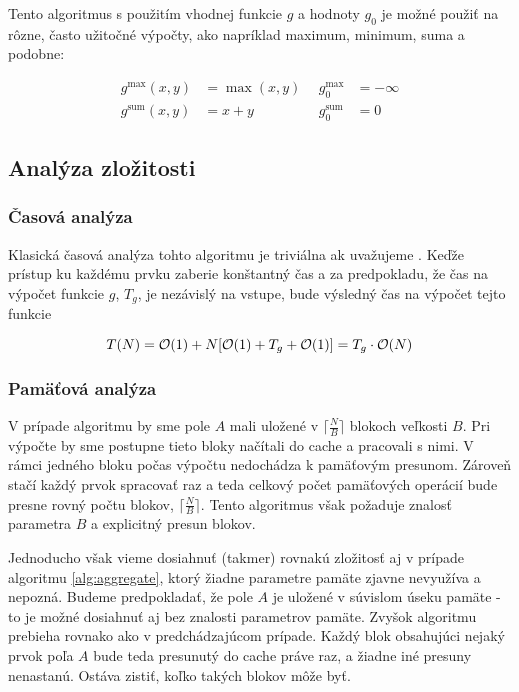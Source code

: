 Tento algoritmus s použitím vhodnej funkcie $g$ a hodnoty $g_0$ je možné použiť na rôzne, často užitočné výpočty, ako napríklad maximum, minimum, suma a podobne:

\[
\begin{aligned}
g^{\textrm{max}}(x, y) &= \max(x, y) ~~ &g^{\textrm{max}}_0 &= -\infty \\
g^{\textrm{sum}}(x,y) &= x+y &g^{\textrm{sum}}_0 &= 0
\end{aligned}
\]


\subsection{Analýza zložitosti}
\subsubsection{Časová analýza}
Klasická časová analýza tohto algoritmu je triviálna ak uvažujeme \RAM. Keďže prístup ku každému prvku  zaberie konštantný čas a za predpokladu, že čas na výpočet funkcie $g$, $T_g$, je nezávislý na vstupe, bude výsledný čas na výpočet tejto funkcie

\[
T(N) = \mathcal{O}(1) + N[\mathcal{O}(1) + T_g + \mathcal{O}(1)] = T_g\cdot\mathcal{O}(N)
\]

\subsubsection{Pamäťová analýza}

V prípade \aware algoritmu by sme pole $A$ mali uložené v $\lceil \frac{N}{B} \rceil$ blokoch veľkosti $B$. Pri výpočte by sme postupne tieto bloky načítali do cache a pracovali s nimi. V rámci jedného bloku počas výpočtu nedochádza k pamäťovým presunom. Zároveň stačí každý prvok spracovať raz a teda celkový počet pamäťových operácií bude presne rovný počtu blokov, $\lceil \frac{N}{B} \rceil$. Tento algoritmus však požaduje znalosť parametra $B$ a explicitný presun blokov.

Jednoducho však vieme dosiahnuť (takmer) rovnakú zložitosť aj v prípade \obliv algoritmu \ref{alg:aggregate}, ktorý žiadne parametre pamäte zjavne nevyužíva a nepozná. Budeme predpokladať, že pole $A$ je uložené v súvislom úseku pamäte - to je možné dosiahnuť aj bez znalosti parametrov pamäte. Zvyšok algoritmu prebieha rovnako ako v predchádzajúcom prípade. Každý blok obsahujúci nejaký prvok poľa $A$ bude teda presunutý do cache práve raz, a žiadne iné presuny nenastanú. Ostáva zistiť, koľko takých blokov môže byť.

